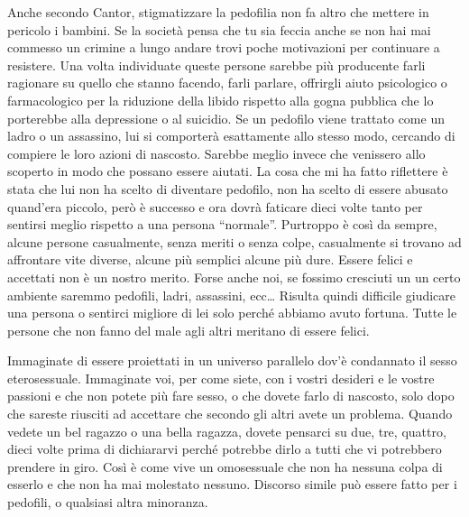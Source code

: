 Anche secondo Cantor, stigmatizzare la pedofilia non fa altro che mettere in pericolo i bambini. Se la società pensa che
tu sia feccia anche se non hai mai commesso un crimine a lungo andare trovi poche motivazioni per continuare a
resistere. Una volta individuate queste persone sarebbe più producente farli ragionare su quello che stanno facendo,
farli parlare, offrirgli aiuto psicologico o farmacologico per la riduzione della libido rispetto alla gogna pubblica
che lo porterebbe alla depressione o al suicidio. Se un pedofilo viene trattato come un ladro o un assassino, lui si
comporterà esattamente allo stesso modo, cercando di compiere le loro azioni di nascosto. Sarebbe meglio invece che
venissero allo scoperto in modo che possano essere aiutati. La cosa che mi ha fatto riflettere è stata che lui non ha
scelto di diventare pedofilo, non ha scelto di essere abusato quand'era piccolo, però è successo e
ora dovrà faticare dieci volte tanto per sentirsi meglio rispetto a una persona “normale”. Purtroppo è così da sempre,
alcune persone casualmente, senza meriti o senza colpe, casualmente si trovano ad affrontare vite diverse, alcune più
semplici alcune più dure. Essere felici e accettati non è un nostro merito. Forse anche noi, se fossimo cresciuti un un
certo ambiente saremmo pedofili, ladri, assassini, ecc… Risulta quindi difficile giudicare una persona o sentirci
migliore di lei solo perché abbiamo avuto fortuna. Tutte le persone che non fanno del male agli altri meritano di
essere felici.

Immaginate di essere proiettati in un universo parallelo dov'è condannato il sesso eterosessuale.
Immaginate voi, per come siete, con i vostri desideri e le vostre passioni e che non potete più fare sesso, o che
dovete farlo di nascosto, solo dopo che sareste riusciti ad accettare che secondo gli altri avete un problema. Quando
vedete un bel ragazzo o una bella ragazza, dovete pensarci su due, tre, quattro, dieci volte prima di dichiararvi
perché potrebbe dirlo a tutti che vi potrebbero prendere in giro. Così è come vive un omosessuale che non ha nessuna
colpa di esserlo e che non ha mai molestato nessuno. Discorso simile può essere fatto per i pedofili, o qualsiasi altra
minoranza.

